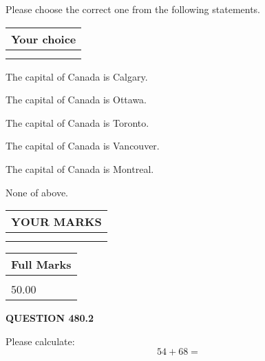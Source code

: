 \documentclass[12pt]{article}
\begin{document}
  
Please choose the correct one from the following statements.
  
  
\noindent\hspace{3.0in} \begin{tabular}{|l|}
\hline
Your choice \\
\hline
 \\ 
 \\ 
\hline
\end{tabular}
  
  
 
 
The capital of Canada is Calgary.
 
 
The capital of Canada is Ottawa.
 
 
The capital of Canada is Toronto.
 
 
The capital of Canada is Vancouver.
 
 
The capital of Canada is Montreal.
 
 
 None of above.
 
 
  
\vspace{0.2in}
  
\noindent\begin{tabular}{|l|}
\hline
 YOUR MARKS  \\
\hline
 \\ 
 \\ 
\hline
\end{tabular}
\hspace{0.05in} \begin{tabular}{|l|}
\hline
 Full Marks  \\
\hline
 \\ 
50.00 \\
\hline
\end{tabular}
{\textbf{\Large{QUESTION
480.2 
}}}
  
  
 
Please calculate:
\begin{equation}
54 +  %
68 = \nonumber
\end{equation}
 

 

 
   
   
 \vspace{0.2in}
 
   
   
   
   
\end{document}
